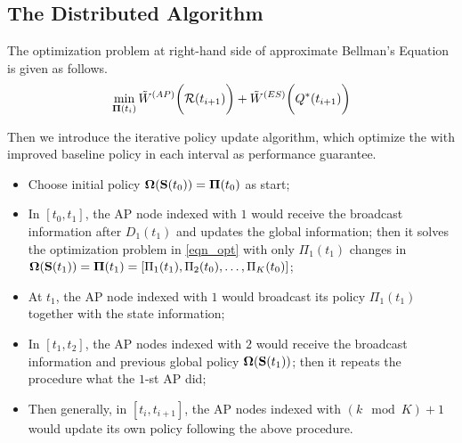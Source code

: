 \subsection{The Distributed Algorithm}

The optimization problem at right-hand side of approximate Bellman's Equation is given as follows.
\begin{align}
    \min_{\boldsymbol{\Pi}(t_i)} \tilde{W}^{(AP)}\bigg(\mathcal{R}(t_{i+1})\bigg) + \tilde{W}^{(ES)}\bigg(Q^*(t_{i+1})\bigg)
    \label{eqn_opt}
\end{align}

Then we introduce the iterative policy update algorithm, which optimize the 
with improved baseline policy in each interval as performance guarantee.
\begin{itemize}
    \item Choose initial policy $\boldsymbol{\Omega}(\mathbf{S}(t_0)) = \boldsymbol{\Pi}(t_0)$ as start;
    \item In $[t_0, t_1]$, the AP node indexed with $1$ would receive the broadcast information after $D_1(t_1)$ and updates the global information; then it solves the optimization problem in \ref{eqn_opt} with only $\Pi_{1}(t_1)$ changes in $\boldsymbol{\Omega}(\mathbf{S}(t_1)) = \boldsymbol{\Pi}(t_1) = [\Pi_{1}(t_1), \Pi_{2}(t_0), \dots, \Pi_{K}(t_0)]$;
    \item At $t_1$, the AP node indexed with $1$ would broadcast its policy $\Pi_{1}(t_1)$ together with the state information;
    \item In $[t_1, t_2]$, the AP nodes indexed with $2$ would receive the broadcast information and previous global policy $\boldsymbol{\Omega}(\mathbf{S}(t_1))$; then it repeats the procedure what the $1$-st AP did;
    \item Then generally, in $[t_{i}, t_{i+1}]$, the AP nodes indexed with $(k \mod K)+1$ would update its own policy following the above procedure.
\end{itemize}

